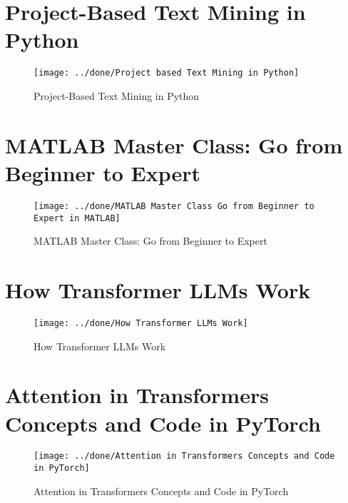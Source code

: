 \documentclass[a4paper,12pt]{article}
\begin{document}
\section*{Project-Based Text Mining in Python}
\begin{figure}[h]
	\centering
	\vspace{-10pt} %
	\texttt{[image: ../done/Project based Text Mining in Python]}
	\vspace{-10pt} %
	\caption{Project-Based Text Mining in Python}
	\vspace{-10pt} %
\end{figure}


\section*{MATLAB Master Class: Go from Beginner to Expert}
\begin{figure}[h]
	\centering
	\vspace{-10pt} %
	\texttt{[image: ../done/MATLAB Master Class Go from Beginner to Expert in MATLAB]}
	\vspace{-10pt} %
	\caption{MATLAB Master Class: Go from Beginner to Expert}
	\vspace{-10pt} %
\end{figure}
\newpage
\section*{How Transformer LLMs Work}
\begin{figure}[h]
	\centering
	\vspace{-10pt} %
	\texttt{[image: ../done/How Transformer LLMs Work]}
	\vspace{-10pt} %
	\caption{How Transformer LLMs Work}
	\vspace{-10pt} %
\end{figure}


\section*{Attention in Transformers Concepts and Code in PyTorch}
\begin{figure}[h]
	\centering
	\texttt{[image: ../done/Attention in Transformers Concepts and Code in PyTorch]}
	\vspace{-10pt} %
	\caption{Attention in Transformers Concepts and Code in PyTorch}
	\vspace{-10pt} %
\end{figure}
\newpage
\end{document}
